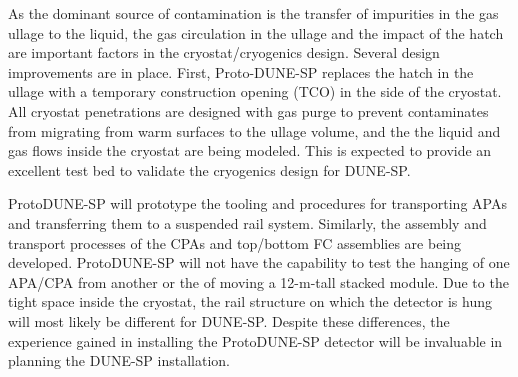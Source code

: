 As the dominant source of contamination is the transfer of impurities in the gas ullage to the liquid, the gas circulation in the ullage and the impact of the hatch are important factors in the cryostat/cryogenics design. Several design improvements are in place. First, Proto-DUNE-SP replaces the hatch in the ullage with a temporary construction opening (TCO) in the side of the cryostat. All cryostat penetrations are designed with gas purge to prevent contaminates from migrating from warm surfaces to the ullage volume, and the the liquid and gas flows inside the cryostat are being modeled. This is expected to provide an excellent test bed to validate the cryogenics design for DUNE-SP. 


ProtoDUNE-SP will prototype the tooling and procedures for transporting APAs and transferring them to a suspended rail system. Similarly, the assembly and transport processes of the CPAs and top/bottom FC assemblies are being developed. ProtoDUNE-SP will not have the capability to test the hanging of one APA/CPA from another or the of moving a 12-m-tall stacked module. Due to the tight space inside the cryostat, the rail structure on which the detector is hung will most likely be different for DUNE-SP. Despite these differences, the experience gained in installing the ProtoDUNE-SP detector will be invaluable in planning the DUNE-SP installation. 


